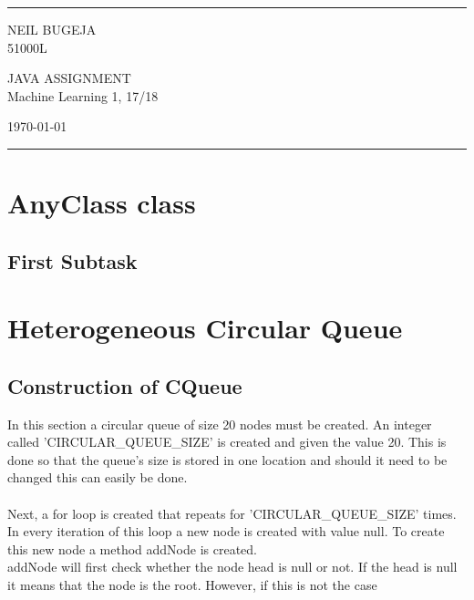 \documentclass[a4paper]{article}
\begin{document}
\graphicspath{{home/Neil/Year 1/Semester 1/Java/Documentation/Images}}


\fancyhead[C]{}
\hrule \medskip %
\begin{minipage}{0.295\textwidth} 
\raggedright
\footnotesize
NEIL BUGEJA\hfill\\   
51000L\hfill\\
\end{minipage}
\begin{minipage}{0.4\textwidth} 
\centering 
\large 
JAVA ASSIGNMENT\\ 
\normalsize 
Machine Learning 1, 17/18\\ 
\end{minipage}
\begin{minipage}{0.295\textwidth} 
\raggedleft
\today\hfill\\
\end{minipage}
\medskip\hrule 
\bigskip

\section{AnyClass class}
\blindtext
\subsection{First Subtask}

\bigskip

\section{Heterogeneous Circular Queue}

\subsection{Construction of CQueue}
In this section a circular queue of size 20 nodes must be created. An integer called 'CIRCULAR\_QUEUE\_SIZE' is created and given the value 20. This is done so that the queue's size is stored in one location and should it need to be changed this can easily be done. \\
\\Next, a for loop is created that repeats for 'CIRCULAR\_QUEUE\_SIZE' times. In every iteration of this loop a new node is created with value null. To create this new node a method addNode is created.\\
addNode will first check whether the node head is null or not. If the head is null it means that the node is the root. However, if this is not the case 
\end{document}
